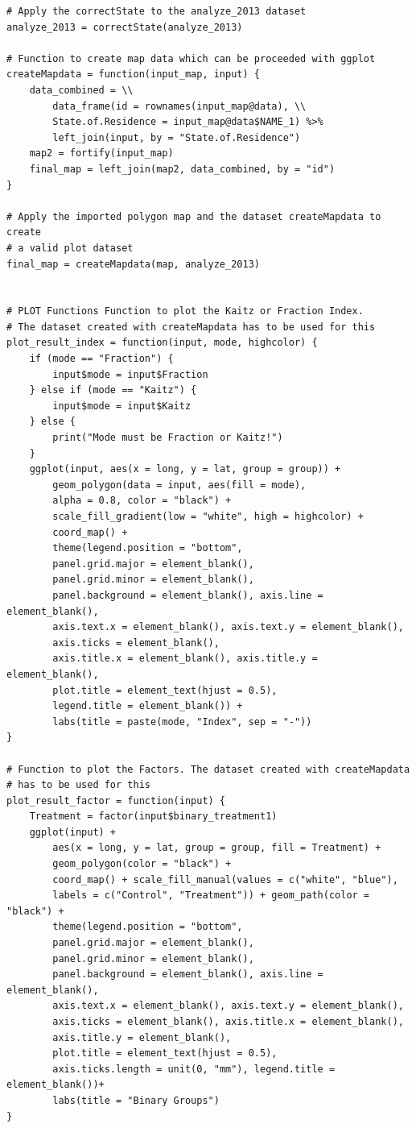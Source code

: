 \documentclass[a4paper]{article}
\begin{document}
{\begin{lstlisting}
# Apply the correctState to the analyze_2013 dataset
analyze_2013 = correctState(analyze_2013)

# Function to create map data which can be proceeded with ggplot
createMapdata = function(input_map, input) {
    data_combined = \\ 
    	data_frame(id = rownames(input_map@data), \\
        State.of.Residence = input_map@data$NAME_1) %>% 
        left_join(input, by = "State.of.Residence")
    map2 = fortify(input_map)
    final_map = left_join(map2, data_combined, by = "id")
}

# Apply the imported polygon map and the dataset createMapdata to create 
# a valid plot dataset
final_map = createMapdata(map, analyze_2013)


# PLOT Functions Function to plot the Kaitz or Fraction Index. 
# The dataset created with createMapdata has to be used for this
plot_result_index = function(input, mode, highcolor) {
    if (mode == "Fraction") {
        input$mode = input$Fraction
    } else if (mode == "Kaitz") {
        input$mode = input$Kaitz
    } else {
        print("Mode must be Fraction or Kaitz!")
    }
    ggplot(input, aes(x = long, y = lat, group = group)) + 
    	geom_polygon(data = input, aes(fill = mode), 
        alpha = 0.8, color = "black") + 
        scale_fill_gradient(low = "white", high = highcolor) + 
        coord_map() + 
        theme(legend.position = "bottom", 
        panel.grid.major = element_blank(),
        panel.grid.minor = element_blank(), 
        panel.background = element_blank(), axis.line = element_blank(), 
        axis.text.x = element_blank(), axis.text.y = element_blank(), 
        axis.ticks = element_blank(), 
        axis.title.x = element_blank(), axis.title.y = element_blank(), 
        plot.title = element_text(hjust = 0.5), 
        legend.title = element_blank()) + 
        labs(title = paste(mode, "Index", sep = "-"))
}

# Function to plot the Factors. The dataset created with createMapdata 
# has to be used for this
plot_result_factor = function(input) {
    Treatment = factor(input$binary_treatment1)
    ggplot(input) + 
    	aes(x = long, y = lat, group = group, fill = Treatment) + 
        geom_polygon(color = "black") + 
        coord_map() + scale_fill_manual(values = c("white", "blue"), 
        labels = c("Control", "Treatment")) + geom_path(color = "black") + 
        theme(legend.position = "bottom",
        panel.grid.major = element_blank(), 
        panel.grid.minor = element_blank(), 
        panel.background = element_blank(), axis.line = element_blank(), 
        axis.text.x = element_blank(), axis.text.y = element_blank(), 
        axis.ticks = element_blank(), axis.title.x = element_blank(), 
        axis.title.y = element_blank(), 
        plot.title = element_text(hjust = 0.5), 
        axis.ticks.length = unit(0, "mm"), legend.title = element_blank())+ 
        labs(title = "Binary Groups")
}


\end{lstlisting}}
\end{document}
